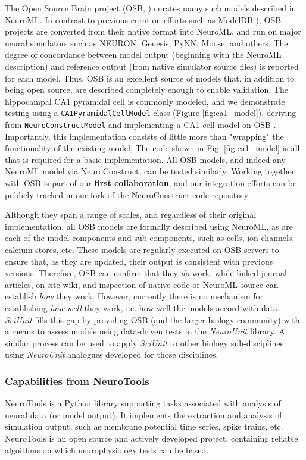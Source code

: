 \documentclass[11pt,letterpaper]{article}
\begin{document}
The Open Source Brain project (OSB, \cite{osb_url}) curates many such models described in NeuroML. In contrast to previous curation efforts such as ModelDB \cite{modeldb_url,hines_modeldb:_2004}), OSB projects are converted from their native format into NeuroML, and run on major neural simulators such as NEURON, Genesis, PyNN, Moose, and others. The degree of concordance between model output (beginning with the NeuroML description) and reference output (from native simulator source files) is reported for each model.  Thus, OSB is an excellent source of models that, in addition to being open source, are described completely enough to enable validation.   The hippocampal CA1 pyramidal cell is commonly modeled, and we demonstrate testing using a \verb|CA1PyramidalCellModel| class (Figure \ref{fig:ca1_model}), deriving from \verb|NeuroConstructModel| and implementing a CA1 cell model on OSB \cite{osb_ca1_url}.  Importantly, this implementation consists of little more than "wrapping" the functionality of the existing model; The code shown in Fig. \ref{fig:ca1_model} is all that is required for a basic implementation.  All OSB models, and indeed any NeuroML model via NeuroConstruct, can be tested similarly.  Working together with OSB is part of our \textbf{first collaboration}, and our integration efforts can be publicly tracked in our fork of the NeuroConstruct code repository \cite{neuroconstruct_rgerkin_url}.  

Although they span a range of scales, and regardless of their original implementation, all OSB models are formally described using NeuroML, as are each of the model components and sub-components, such as cells, ion channels, calcium stores, etc.  These models are regularly executed on OSB servers to ensure that, as they are updated, their output is consistent with previous versions.  Therefore, OSB can confirm that they \textit{do} work, while linked journal articles, on-site wiki, and inspection of native code or NeuroML source can establish \textit{how} they work. However, currently there is no mechanism for establishing \textit{how well} they work, i.e. how well the models accord with data.  \textit{SciUnit} fills this gap by providing OSB (and the larger biology community) with a means to assess models using data-driven tests in the \textit{NeuroUnit} library.  A similar process can be used to apply \textit{SciUnit} to other biology sub-disciplines using \textit{NeuroUnit} analogues developed for those disciplines.

\subsubsection{Capabilities from NeuroTools}
NeuroTools \cite{neuralensemble_url} is a Python library supporting tasks associated with analysis of neural data (or model output).  It implements the extraction and analysis of simulation output, such as membrane potential time series, spike trains, etc. NeuroTools is an open source and actively developed project, containing reliable algoithms on which neurophysiology tests can be based. 
\end{document}
